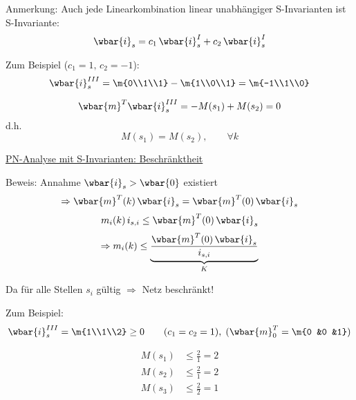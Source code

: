 Anmerkung: Auch jede Linearkombination linear unabhängiger S-Invarianten ist S-Invariante:
\begin{equation}
	\wbar{i}_s = c_1 \, \wbar{i}_{s}^{I} + c_2 \, \wbar{i}_{s}^{I}
\end{equation}

Zum Beispiel ($c_1=1,\,c_2=-1$):
\begin{equation}
	\wbar{i}_{s}^{III} = \m{0\\1\\1} - \m{1\\0\\1} = \m{-1\\1\\0}
\end{equation}

\begin{equation}
	\wbar{m}^T \wbar{i}_{s}^{III} = -M(s_1) + M(s_2) = 0
\end{equation}
d.h.
\begin{equation}
	M(s_1) = M(s_2), \qquad \forall k
\end{equation}

\underline{PN-Analyse mit S-Invarianten: Beschränktheit}

Beweis: Annahme $\wbar{i}_s > \wbar{0}$ existiert
\begin{equation}
	\Rightarrow \wbar{m}^T(k) \, \wbar{i}_s = \wbar{m}^T(0) \, \wbar{i}_s
\end{equation}
\begin{equation}
	m_i(k) \, i_{s,i} \le \wbar{m}^T(0) \, \wbar{i}_s
\end{equation}
\begin{equation}
	\Rightarrow m_i(k) \le \underbrace{\frac{\wbar{m}^T(0) \, \wbar{i}_s}{i_{s,i}}}_{K}
\end{equation}

Da für alle Stellen $s_i$ gültig $\Rightarrow$ Netz beschränkt!

Zum Beispiel:
\begin{equation}
	\wbar{i}_s^{III} = \m{1\\1\\2} \ge 0 \qquad (c_1=c_2=1), \; (\wbar{m}_0^T=\m{0 &0 &1})
\end{equation}

\begin{align}
M(s_1) & \le \frac{2}{1} = 2 \\[1em]
M(s_2) & \le \frac{2}{1} = 2 \\[1em]
M(s_3) & \le \frac{2}{2} = 1 
\end{align}

